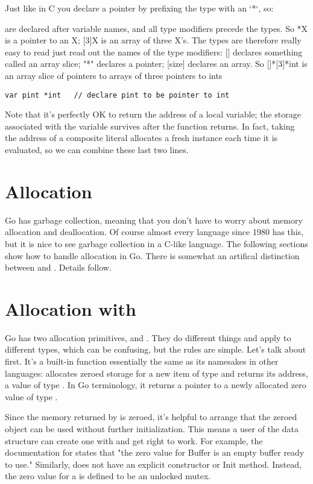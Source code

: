 Just like in C you declare a pointer by prefixing the type with an `*`,
so:

are declared after variable names, and all type modifiers precede the
\todo{}%
types. So *X is a pointer to an X; [3]X is an array of three X's. The
types are therefore really easy to read just read out the names of the
type modifiers: [] declares something called an array slice; "*"
declares a pointer; [size] declares an array. So []*[3]*int is an array
slice of pointers to arrays of three pointers to ints

\noindent\lstinline{var pint *int   // declare pint to be pointer to int}

Note that it's perfectly OK to return the address of a local variable; the
storage associated with the variable survives after the function returns. In
fact, taking the address of a composite literal allocates a fresh instance each
time it is evaluated, so we can combine these last two lines. \cite{effective_go}

\section{Allocation}
Go has garbage collection, meaning that you don't have to worry about
memory allocation and deallocation. Of course almost every language
since 1980 has this, but it is nice to see garbage collection in a
C-like language. The following sections show how to handle allocation
in Go. There is somewhat an artifical distinction between
 and . Details follow.

\section{Allocation with }
Go has two allocation primitives,  and . They do different
things and apply to different types, which can be confusing, but the
rules are simple. Let's talk about  first. It's a built-in function
essentially the same as its namesakes in other languages: 
allocates zeroed storage for a new item of type  and returns its
address, a value of type . In Go terminology, it returns a pointer to
a newly allocated zero value of type .

Since the memory returned by  is zeroed, it's helpful to arrange
that the zeroed object can be used without further initialization. This
means a user of the data structure can create one with  and get
right to work. For example, the documentation for  states
that "the zero value for Buffer is an empty buffer ready to use."
Similarly,  does not have an explicit constructor or Init
method. Instead, the zero value for a  is defined to be an
unlocked mutex.

